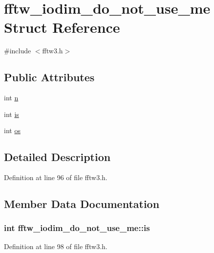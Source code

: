 \hypertarget{structfftw__iodim__do__not__use__me}{\section{fftw\-\_\-iodim\-\_\-do\-\_\-not\-\_\-use\-\_\-me Struct Reference}
\label{structfftw__iodim__do__not__use__me}
}


{\ttfamily \#include $<$fftw3.\-h$>$}

\subsection*{Public Attributes}
\begin{DoxyCompactItemize}
\item 
int \hyperlink{structfftw__iodim__do__not__use__me_aa9ceb61afc1731380bdb48305aa40ce0}{n}
\item 
int \hyperlink{structfftw__iodim__do__not__use__me_a7571fd050be3b9c9486d41086b657099}{is}
\item 
int \hyperlink{structfftw__iodim__do__not__use__me_acff6a6b2225f610d3bee5380e801abb4}{os}
\end{DoxyCompactItemize}


\subsection{Detailed Description}


Definition at line 96 of file fftw3.\-h.



\subsection{Member Data Documentation}
\hypertarget{structfftw__iodim__do__not__use__me_a7571fd050be3b9c9486d41086b657099}{
\subsubsection[{is}]{\setlength{\rightskip}{0pt plus 5cm}int fftw\-\_\-iodim\-\_\-do\-\_\-not\-\_\-use\-\_\-me\-::is}}\label{structfftw__iodim__do__not__use__me_a7571fd050be3b9c9486d41086b657099}


Definition at line 98 of file fftw3.\-h.

